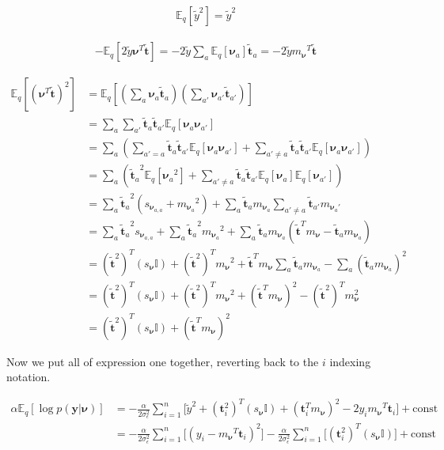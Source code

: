 \documentclass[letterpaper,12pt]{article}
\newcommand{\lp}{\left (} %
\newcommand{\rp}{\right )} %
\newcommand{\lb}{\left [} %
\newcommand{\rb}{\right ]} %
\newcommand{\sigmaepsilon}{\sigma_\epsilon^2} %
\newcommand{\nuv}{\boldsymbol{\nu}} %
\newcommand{\ti}{\boldsymbol{t}_i} %
\newcommand{\ytilde}{\ensuremath{\tilde{y}}} %
\newcommand{\ttilde}{\ensuremath{\tilde{\boldsymbol{t}}}} %
\newcommand{\mnu}{\ensuremath{m_\nuv}} %
\newcommand{\snu}{\ensuremath{s_\nuv}} %
\newcommand{\nua}{\ensuremath{\nuv_a}} %
\newcommand{\tatilde}{\ensuremath{\ttilde_a}} %
\newcommand{\nuaprime}{\ensuremath{\nuv_{a'}}} %
\newcommand{\taprimetilde}{\ensuremath{\ttilde_{a'}}} %
\newcommand{\mnusub}[1]{\ensuremath{m_{\nuv_#1}}} %
\newcommand{\E}{\mathbb{E}_q}
\begin{document}
\begin{equation}
\begin{split}
     \E \lb \ytilde^2 \rb = \ytilde^2 
\end{split}
\end{equation}

\begin{equation}
\begin{split}
        - \E \lb 2 \ytilde \nuv^T \ttilde \rb = -2 \ytilde \sum_a \E \lb \nua \rb  \tatilde = - 2 \ytilde {\mnu}^T \ttilde 
\end{split}
\end{equation}

\begin{equation}
\begin{split}
    \E \lb ( \nuv^T \ttilde)^2 \rb &= \E \lb \lp \sum_a \nua \tatilde \rp \lp \sum_{a'} \nuaprime \taprimetilde \rp \rb \\
    &= \sum_a \sum_{a'} \tatilde \taprimetilde \E \lb \nua \nuaprime \rb \\
    &= \sum_a \lp \sum_{a' = a}  \tatilde \taprimetilde \E \lb \nua \nuaprime \rb + \sum_{a' \neq a}  \tatilde \taprimetilde \E \lb \nua \nuaprime \rb \rp \\
    &= \sum_a \lp \tatilde^2 \E \lb \nua ^2 \rb + \sum_{a' \neq a} \tatilde \taprimetilde \E \lb \nua \rb \E \lb \nuaprime \rb \rp \\
    &= \sum_a \tatilde^2 \lp s_{\nuv_{a,a}} + \mnusub{a}^2 \rp + \sum_a  \tatilde \mnusub{a} \sum_{a' \neq a} \taprimetilde \mnusub{a'} \\
    &= \sum_a \tatilde^2  s_{\nuv_{a,a}} + \sum_a \tatilde^2 \mnusub{a}^2 + \sum_a \tatilde \mnusub{a} \lp \ttilde^T {\mnu} - \tatilde \mnusub{a} \rp \\
    &= (\ttilde^2)^T ({\snu} \mathbb{I}) + (\ttilde^2)^T {\mnu}^2 + \ttilde^T   m_{\nuv} \sum_a \tatilde \mnusub{a} - \sum_a (\tatilde \mnusub{a} )^2 \\
    &= (\ttilde^2)^T ({\snu} \mathbb{I}) + (\ttilde^2)^T {\mnu}^2 + (\ttilde^T   m_{\nuv})^2  - (\ttilde^2)^T m_{\nuv}^2  \\
    &= (\ttilde^2)^T ({\snu} \mathbb{I}) + (\ttilde^T   m_{\nuv})^2 
\end{split}
\end{equation}

Now we put all of expression one together, reverting back to the $i$ indexing notation.

\begin{equation}
\begin{split}
    \alpha \E \lb \log p(\boldsymbol{y} | \nuv) \rb &= -\frac{\alpha}{2 \sigmaepsilon} \sum_{i=1}^n \Bigg[\ytilde^2 + (\ti^2)^T ({\snu} \mathbb{I}) + (\ti^T   m_{\nuv})^2  - 2 y_i {\mnu}^T \ti \Bigg] + \textrm{const} \\
    &= -\frac{\alpha}{2 \sigmaepsilon} \sum_{i=1}^n \Bigg[(y_i - {\mnu}^T \ti)^2 \Bigg] -\frac{\alpha}{2 \sigmaepsilon} \sum_{i=1}^n \Bigg[ (\ti^2)^T ({\snu} \mathbb{I}) \Bigg] + \textrm{const} \\
\end{split}
\end{equation}
\end{document}
